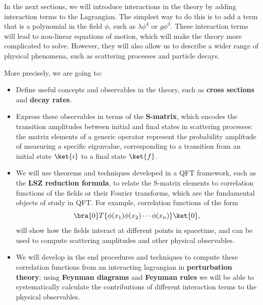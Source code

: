 In the next sections, we will introduce interactions in the theory by adding interaction terms to the Lagrangian. The simplest way to do this is to add a term that is a polynomial in the field \(\phi\), such as \(\lambda \phi^4\) or \(g \phi^3\). These interaction terms will lead to non-linear equations of motion, which will make the theory more complicated to solve. However, they will also allow us to describe a wider range of physical phenomena, such as scattering processes and particle decays.

More precisely, we are going to:
\begin{itemize}
    \item Define useful concepts and observables in the theory, such as \textbf{cross sections} and \textbf{decay rates}.
    \item Express these observables in terms of the \textbf{S-matrix}, which encodes the transition amplitudes between initial and final states in scattering processes: the matrix elements of a generic operator represent the probability amplitude of measuring a specific eigenvalue, corresponding to a transition from an initial state \(\ket{i}\) to a final state \(\ket{f}\).
    \item We will use theorems and techniques developed in a QFT framework, such as the \textbf{LSZ reduction formula}, to relate the S-matrix elements to correlation functions of the fields or their Fourier transforms, which are the fundamental objects of study in QFT. For example, correlation functions of the form
          \[
              \bra{0} T\{\phi(x_1) \phi(x_2) \cdots \phi(x_n)\} \ket{0},
          \]
          will show how the fields interact at different points in spacetime, and can be used to compute scattering amplitudes and other physical observables.
    \item We will develop in the end procedures and techniques to compute these correlation functions from an interacting lagrangian in \textbf{perturbation theory}; using \textbf{Feynman diagrams} and \textbf{Feynman rules} we will be able to systematically calculate the contributions of different interaction terms to the physical observables.
\end{itemize}